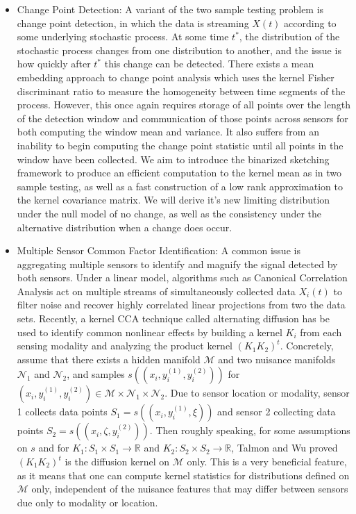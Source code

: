 \documentclass{article}
\begin{document}
\begin{itemize}
\item Change Point Detection: A variant of the two sample testing problem is change point detection, in which the data is streaming $X(t)$ according to some underlying stochastic process.  At some time $t^*$, the distribution of the stochastic process changes from one distribution to another, and the issue is how quickly after $t^*$ this change can be detected.   There exists a mean embedding approach to change point analysis \cite{Bach 2008} which uses the kernel Fisher discriminant ratio to measure the homogeneity between time segments of the process.  However, this once again requires storage of all points over the length of the detection window and communication of those points across sensors for both computing the window mean and variance. It also suffers from an inability to begin computing the change point statistic until all points in the window have been collected.  We aim to introduce the binarized sketching framework to produce an efficient computation to the kernel mean as in two sample testing, as well as a fast construction of a low rank approximation to the kernel covariance matrix.  We will derive it's new limiting distribution under the null model of no change, as well as the consistency under the alternative distribution when a change does occur.  

\item Multiple Sensor Common Factor Identification: A common issue is aggregating multiple sensors to identify and magnify the signal detected by both sensors.  Under a linear model, algorithms such as Canonical Correlation Analysis \cite{} act on multiple streams of simultaneously collected data $X_i(t)$ to filter noise and recover highly correlated linear projections from two the data sets.
Recently, a kernel CCA technique called alternating diffusion \cite{Talmon Lederman} has be used to identify common nonlinear effects by building a kernel $K_i$ from each sensing modality and analyzing the product kernel $(K_1 K_2)^t$.   Concretely, assume that there exists a hidden manifold $\mathcal{M}$ and two nuisance manifolds $\mathcal{N}_1$ and $\mathcal{N}_2$, and samples $s((x_i,y_i^{(1)}, y_i^{(2)}))$ for $(x_i,y_i^{(1)}, y_i^{(2)})\in \mathcal{M}\times \mathcal{N}_1\times \mathcal{N}_2$.  Due to sensor location or modality, sensor 1 collects data points $S_1 = s((x_i,y_i^{(1)}, \xi))$ and sensor 2 collecting data points $S_2 = s((x_i,\zeta,y_i^{(2)}))$.  Then roughly speaking, for some assumptions on $s$ and for $K_1: S_1\times S_1 \rightarrow \mathbb{R}$ and $K_2:S_2\times S_2 \rightarrow \mathbb{R}$, Talmon and Wu \cite{Talmon Wu} proved $(K_1 K_2)^t$ is the diffusion kernel on $\mathcal{M}$ only.   This is a very beneficial feature, as it means that one can compute kernel statistics for distributions defined on $\mathcal{M}$ only, independent of the nuisance features that may differ between sensors due only to modality or location.



\end{itemize}
\end{document}
